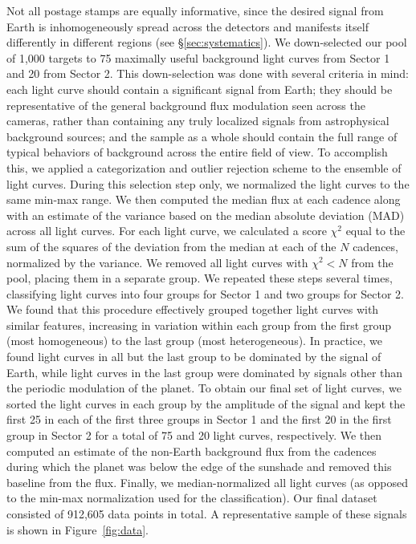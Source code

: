 \documentclass[modern]{aastex62}
\begin{document}
Not all postage stamps are equally informative, since the desired signal from 
Earth is inhomogeneously spread across the \TESS detectors and manifests itself
differently in different regions (see \S\ref{sec:systematics}). 
We down-selected our pool of 1,000 targets to 75 maximally useful background 
light curves from Sector 1 and 20 from Sector 2. 
This down-selection was done with several criteria in mind: each light curve 
should contain a significant signal from Earth; they should be representative 
of the general background flux modulation seen across the \TESS cameras, rather 
than containing any truly localized signals from astrophysical background 
sources; and the sample as a whole should contain the full range of typical 
behaviors of background across the entire \TESS field of view. 
To accomplish this, we applied a categorization and outlier rejection scheme to the ensemble of light curves.
During this selection step only, we normalized the light curves to the same min-max range.
We then computed the median
flux at each cadence along with an estimate of the variance based on the
median absolute deviation (MAD) across all light curves.
For each light curve, we calculated a score $\chi^2$ equal to the sum of the squares of the
deviation from the median at each of the $N$ cadences, normalized by the variance.
We removed all light curves with $\chi^2 < N$ from the pool, placing
them in a separate group. We repeated these steps several times,
classifying light curves into four groups for Sector 1 and two groups for Sector 2. 
We found that this
procedure effectively grouped together light curves with similar features,
increasing in variation within each group from the first group (most homogeneous) 
to the last group (most heterogeneous). In practice, we found light curves
in all but the last group to be dominated by 
the signal of Earth, while light
curves in the last group were dominated by signals other than the
periodic modulation of the planet. To obtain our final set of light curves, 
we sorted the light curves in each group by the amplitude
of the signal and kept the first 25 in each of the first three groups in Sector 1
and the first 20 in the first group in Sector 2 for a total
of 75 and 20 light curves, respectively. We then computed an estimate of the
non-Earth background flux from the cadences during which the planet was below
the edge of the sunshade and removed this baseline from the flux.
Finally, we median-normalized all light curves (as opposed to the min-max
normalization used for the classification).
Our final dataset consisted of 912,605 data points in total. 
A representative sample of these signals is shown in Figure~\ref{fig:data}.
\end{document}
